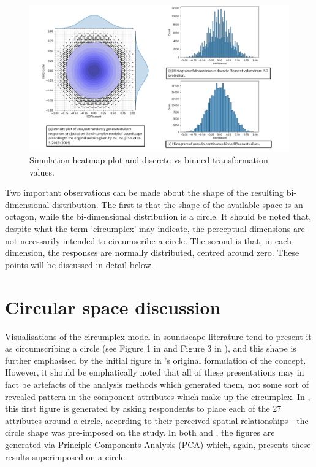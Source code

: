 \begin{figure}
  \includegraphics[width=\textwidth]{Figures/Combined_sim_hist.png}
  \caption{Simulation heatmap plot and discrete vs binned transformation values. 
    \label{fig:isoheatmap}
  }
\end{figure}

Two important observations can be made about the shape of the resulting bi-dimensional distribution. The first is that the shape of the available space is an octagon, while the bi-dimensional distribution is a circle. It should be noted that, despite what the term 'circumplex' may indicate, the perceptual dimensions are not necessarily intended to circumscribe a circle. The second is that, in each dimension, the responses are normally distributed, centred around zero. These points will be discussed in detail below.

\section{Circular space discussion}
Visualisations of the circumplex model in soundscape literature tend to present it as circumscribing a circle (see Figure 1 in \citep{Axelsson2010principal} and Figure 3 in \citep{Torresin2020Indoor}), and this shape is further emphasised by the initial figure in \citet{Russell1980circumplex}'s original formulation of the concept. However, it should be emphatically noted that all of these presentations may in fact be artefacts of the analysis methods which generated them, not some sort of revealed pattern in the component attributes which make up the circumplex. In \citet{Russell1980circumplex}, this first figure is generated by asking respondents to place each of the 27 attributes around a circle, according to their perceived spatial relationships - the circle shape was pre-imposed on the study. In both \citet{Axelsson2010principal} and \citet{Torresin2020Indoor}, the figures are generated via Principle Components Analysis (PCA) which, again, presents these results superimposed on a circle. 

